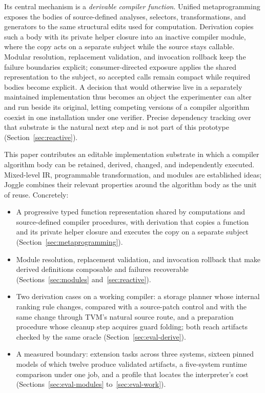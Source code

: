 \documentclass[sigplan,anonymous,review]{acmart}
\begin{document}
Its central mechanism is a \emph{derivable compiler function}. Unified
metaprogramming exposes the bodies of source-defined analyses, selectors,
transformations, and generators to the same structural edits used for
computation. Derivation copies such a body with its private helper closure into
an inactive compiler module, where the copy acts on a separate subject while
the source stays callable. Modular resolution, replacement validation, and
invocation rollback keep the failure boundaries explicit; consumer-directed
exposure applies the shared representation to the subject, so accepted calls
remain compact while required bodies become explicit. A decision that would
otherwise live in a separately maintained implementation thus becomes an object
the experimenter can alter and run beside its original, letting competing
versions of a compiler algorithm coexist in one installation under one verifier.
Precise dependency tracking over that substrate is the natural next step and is
not part of this prototype (Section~\ref{sec:reactive}).

This paper contributes an editable implementation substrate in which a compiler
algorithm body can be retained, derived, changed, and independently executed.
Mixed-level IR, programmable transformation, and modules are established ideas;
Joggle combines their relevant properties around the algorithm body as the unit
of reuse. Concretely:
\begin{itemize}[leftmargin=1.2em,itemsep=1pt,topsep=2pt]
\item A progressive typed function representation shared by computations and
  source-defined compiler procedures, with derivation that copies a function
  and its private helper closure and executes the copy on a separate subject
  (Section~\ref{sec:metaprogramming}).
\item Module resolution, replacement validation, and invocation rollback that
  make derived definitions composable and failures recoverable
  (Sections~\ref{sec:modules} and~\ref{sec:reactive}).
\item Two derivation cases on a working compiler: a storage planner whose
  internal ranking rule changes, compared with a source-patch control and
  with the same change through TVM's natural source route, and a preparation
  procedure whose cleanup step acquires guard folding; both reach artifacts
  checked by the same oracle (Section~\ref{sec:eval-derive}).
\item A measured boundary: extension tasks across three systems, sixteen pinned
  models of which twelve produce validated artifacts, a five-system runtime
  comparison under one job, and a profile that locates the interpreter's cost
  (Sections~\ref{sec:eval-modules} to~\ref{sec:eval-work}).
\end{itemize}
\end{document}
